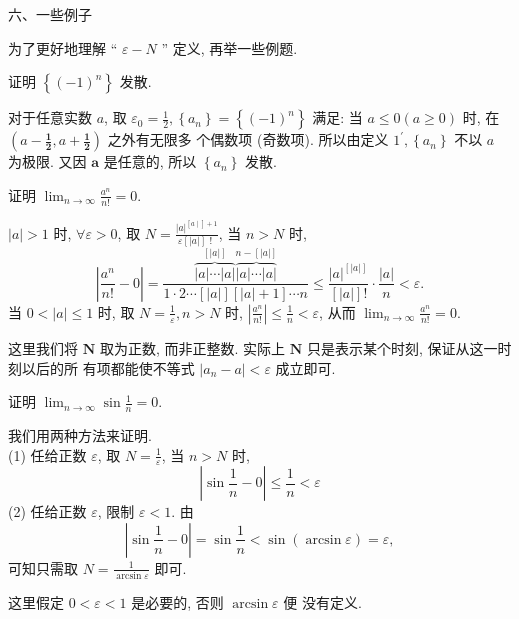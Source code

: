 \documentclass [t,12pt,mathserif] {beamer}
\begin{document}
\begin{frame}{ 六、一些例子}%
 
为了更好地理解 “ $\varepsilon-N$ ” 定义, 再举一些例题.
\begin{ex}
证明 $\left\{(-1)^n\right\}$ 发散.
\end{ex} 
\zheng 对于任意实数 $a$, 取 $\varepsilon_0=\frac{1}{2},\left\{a_n\right\}=\left\{(-1)^n\right\}$ 满足: 当 $a \leq 0(a \geq 0)$ 时, 在 $\left(a-\frac{\mathbf{1}}{\mathbf{2}}, a+\frac{\mathbf{1}}{\mathbf{2}}\right)$ 之外有无限多 个偶数项 (奇数项). 所以由定义 $1^{\prime},\left\{a_n\right\}$ 不以 $a$ 为极限. 又因 $\boldsymbol{a}$ 是任意的, 所以 $\left\{a_n\right\}$ 发散.  
\end{frame}


\begin{frame}{}%
\begin{ex}
证明 $\lim _{n \rightarrow \infty} \frac{a^n}{n !}=0$.
\end{ex} 
\zheng $|a|>1$ 时, $\forall \varepsilon>0$, 取 $N=\frac{|a|^{[a \mid]+1}}{\varepsilon[|a|] \text { ! }}$, 当 $n>N$ 时,
$$
\left|\frac{a^n}{n !}-0\right|=\frac{\overbrace{|a| \cdots|a|}^{[|a|]} \overbrace{|a| \cdots|a|}^{n-[|a|]} }{1 \cdot 2 \cdots[|a|][|a|+1] \cdots n} \leq \frac{|a|^{[|a|]}}{[|a|] !} \cdot \frac{|a|}{n}<\varepsilon .
$$
当 $0<|a| \leq 1$ 时, 取 $N=\frac{1}{\varepsilon}, n>N$ 时, $\left|\frac{a^n}{n !}\right| \leq \frac{1}{n}<\varepsilon$, 从而 $\lim _{n \rightarrow \infty} \frac{a^n}{n !}=0$.  
\begin{alertblock}{}
  这里我们将 $\boldsymbol{N}$ 取为正数, 而非正整数. 实际上 $\boldsymbol{N}$ 只是表示某个时刻, 保证从这一时刻以后的所 有项都能使不等式 $\left|a_n-a\right|<\varepsilon$ 成立即可. 
\end{alertblock}
\end{frame}

\begin{frame}{}%
\begin{ex}
 证明 $\lim _{n \rightarrow \infty} \sin \frac{1}{n}=0$. 
\end{ex}  
\zheng 我们用两种方法来证明.\\
(1) 任给正数 $\varepsilon$, 取 $N=\frac{1}{\varepsilon}$, 当 $n>N$ 时,
$$
\left|\sin \frac{1}{n}-0\right| \leq \frac{1}{n}<\varepsilon
$$
(2) 任给正数 $\varepsilon$, 限制 $\varepsilon<1$. 由
$$
\left|\sin \frac{1}{n}-0\right|=\sin \frac{1}{n}<\sin (\arcsin \varepsilon)=\varepsilon,
$$
可知只需取 $N=\frac{1}{\arcsin \varepsilon}$ 即可.
\begin{alertblock}{}
  这里假定 $0<\varepsilon<1$ 是必要的, 否则 $\arcsin \varepsilon$ 便 没有定义.
\end{alertblock}

\end{frame}
\end{document}
